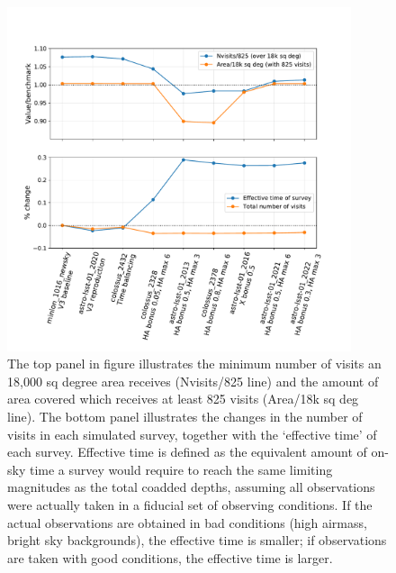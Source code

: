\documentclass[DM,lsstdraft,authoryear,toc]{lsstdoc}
\begin{document}
\begin{figure}[ht]
\centering
\includegraphics[width=0.9\textwidth]{figures/srd}
\caption{The top panel in figure illustrates the minimum number of visits an 18,000 sq degree area receives (Nvisits/825 line) and the amount of area covered which receives at least 825 visits (Area/18k sq deg line).  The bottom panel illustrates the changes in the number of visits in each simulated survey, together with the `effective time' of each survey. Effective time is defined as the equivalent amount of on-sky time a survey would require to reach the same limiting magnitudes as the total coadded depths, assuming all observations were actually taken in a fiducial set of observing conditions. If the actual observations are obtained in bad conditions (high airmass, bright sky backgrounds), the effective time is smaller; if observations are taken with good conditions, the effective time is larger.
\label{fig:srd}}
\end{figure}
\end{document}
